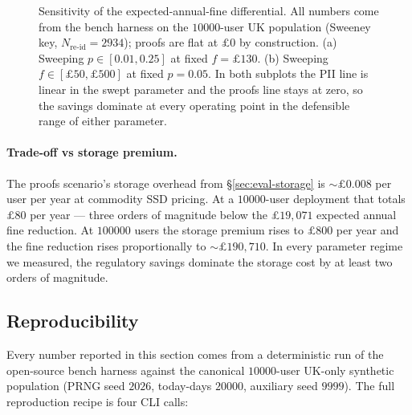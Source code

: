 \documentclass[11pt,a4paper]{article}
\begin{document}
\begin{figure}[h]
\caption{Sensitivity of the expected\nobreakdash-annual\nobreakdash-fine
  differential.  All numbers come from the bench harness on the
  $\num{10000}$\nobreakdash-user UK population (Sweeney key,
  $N_{\text{re-id}} = 2934$); proofs are flat at $\pounds 0$ by
  construction.  (a) Sweeping $p \in [0.01, 0.25]$ at fixed
  $f = \pounds 130$.  (b) Sweeping $f \in [\pounds 50, \pounds 500]$
  at fixed $p = 0.05$.  In both subplots the PII line is linear
  in the swept parameter and the proofs line stays at zero, so
  the savings dominate at every operating point in the
  defensible range of either parameter.}
\label{fig:sensitivity}
\end{figure}

\paragraph{Trade-off vs storage premium.}  The proofs scenario's
storage overhead from \S\ref{sec:eval-storage} is
$\sim\!\pounds 0.008$ per user per year at commodity SSD
pricing.  At a $\num{10000}$\nobreakdash-user deployment that totals
$\pounds 80$ per year — three orders of magnitude below the
\pounds$19{,}071$ expected annual fine reduction.  At
$\num{100000}$ users the storage premium rises to $\pounds 800$
per year and the fine reduction rises proportionally to
$\sim\!\pounds 190{,}710$.  In every parameter regime we measured,
the regulatory savings dominate the storage cost by at least two
orders of magnitude.

\subsection{Reproducibility}
\label{sec:eval-repro}

Every number reported in this section comes from a deterministic
run of the open\nobreakdash-source bench harness against the
canonical $\num{10000}$\nobreakdash-user UK\nobreakdash-only
synthetic population (PRNG seed $2026$, today\nobreakdash-days
$\num{20000}$, auxiliary seed $9999$).  The full reproduction
recipe is four CLI calls:
\end{document}
